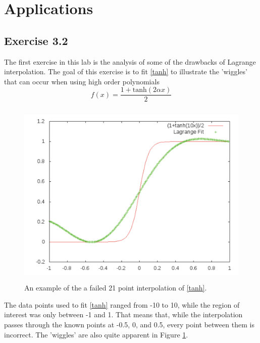 \documentclass[12pt]{article}
\begin{document}
\section{Applications}
\subsection{Exercise 3.2}
The first exercise in this lab is the analysis of some of the drawbacks of Lagrange interpolation.  The goal of this exercise is to fit \eqref{tanh} to illustrate the 'wiggles' that can occur when using high order polynomials
\begin{equation}
\label{tanh}
f(x) = \frac{1+\text{tanh}(2\alpha x)}{2}
\end{equation}
\begin{figure}[!h]
\centering
\includegraphics[width =120 mm, height = 90mm]{Ex_3_2.pdf}
\caption{An example of the a failed 21 point interpolation of \eqref{tanh}.}
\label{fig:3.2}
\end{figure}
The data points used to fit \eqref{tanh} ranged from -10 to 10, while the region of interest was only between -1 and 1.  That means that, while the interpolation passes through the known points at -0.5, 0, and 0.5, every point between them is incorrect.  The 'wiggles' are also quite apparent in Figure \ref{fig:3.2}.
\end{document}

